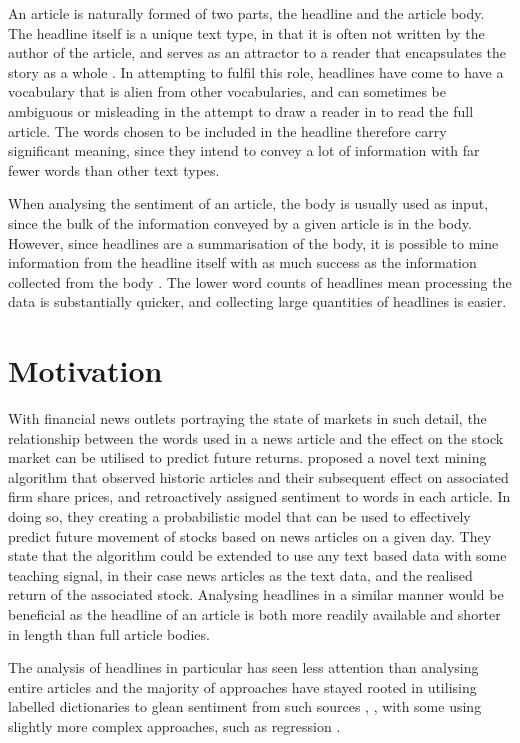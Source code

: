 An article is naturally formed of two parts, the headline and the article body. The headline itself is a unique text type, in that it is often not written by the author of the article, and serves as an attractor to a reader that encapsulates the story as a whole \parencite{language-newspapers}. In attempting to fulfil this role, headlines have come to have a vocabulary that is alien from other vocabularies, and can sometimes be ambiguous or misleading in the attempt to draw a reader in to read the full article. The words chosen to be included in the headline therefore carry significant meaning, since they intend to convey a lot of information with far fewer words than other text types.

When analysing the sentiment of an article, the body is usually used as input, since the bulk of the information conveyed by a given article is in the body. However, since headlines are a summarisation of the body, it is possible to mine information from the headline itself with as much success as the information collected from the body \parencite{kirange2016sentiment}. The lower word counts of headlines mean processing the data is substantially quicker, and collecting large quantities of headlines is easier.

\section{Motivation}
\label{sec:motivation}
With financial news outlets portraying the state of markets in such detail, the relationship between the words used in a news article and the effect on the stock market can be utilised to predict future returns. \textcite{sestm} proposed a novel text mining algorithm that observed historic articles and their subsequent effect on associated firm share prices, and retroactively assigned sentiment to words in each article. In doing so, they creating a probabilistic model that can be used to effectively predict future movement of stocks based on news articles on a given day. They state that the algorithm could be extended to use any text based data with some teaching signal, in their case news articles as the text data, and the realised return of the associated stock. Analysing headlines in a similar manner would be beneficial as the headline of an article is both more readily available and shorter in length than full article bodies.

The analysis of headlines in particular has seen less attention than analysing entire articles and the majority of approaches have stayed rooted in utilising labelled dictionaries to glean sentiment from such sources \parencite{kirange2016sentiment}, \parencite{nemes-prediction}, with some using slightly more complex approaches, such as regression \parencite{john2017sentiment}.

